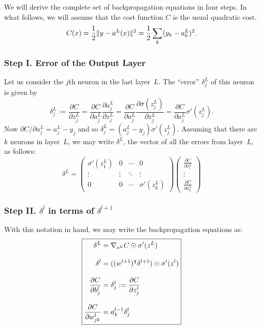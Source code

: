 We will derive the complete set of backpropagation equations in four steps. In what
follows, we will assume that the cost function $C$ is the usual quadratic cost.
\[
    C(x) = \frac{1}{2} \lVert y - a^L(x)\rVert^2 = \frac{1}{2} \sum_{k} (y_k - a_k^L)^2.
\]
\subsubsection{Step I. Error of the Output Layer}
Let us consider the $j$th neuron in the last layer~$L$. The ``error'' $\delta_j^L$
of this neuron is given by
\[
    \delta_j^L := \frac{\partial C}{\partial z_j^L}
    = \frac{\partial C}{\partial a_j^L} \frac{\partial a_j^L}{\partial z_j^L}
    = \frac{\partial C}{\partial a_j^L} \frac{\partial \sigma(z_j^L)}{\partial z_j^L}
    = \frac{\partial C}{\partial a_j^L} \sigma'(z_j^L).
\]
Now $\partial C / \partial a_j^L = a_j^L - y_j$ and so
$\delta_j^L = (a_j^L - y_j) \sigma'(z_j^L)$. Assuming that there are $k$ neurons
in layer~$L$, we may write $\delta^L$, the vector of all the errors from layer~$L$,
as follows:
\begin{equation}
    \delta^L =
    \begin{pmatrix}
        \sigma'(z_1^L)  & 0              & \cdots & 0 \\
        \vdots          & \vdots         & \ddots & \vdots  \\
        0               & 0              & \cdots & \sigma'(z_k^L)
    \end{pmatrix}
    \begin{pmatrix}
        \frac{\partial C}{\partial a_1^L} \\
        \vdots \\
        \frac{\partial C}{\partial a_k^L}
    \end{pmatrix}
\end{equation}

\subsubsection{Step II. $\delta^l$ in terms of $\delta^{l + 1}$}

With this notation in hand, we may write the backpropagation equations
as:
\begin{equation}
\boxed{
\setlength{\jot}{12pt}
\begin{aligned}
    \delta^{L} & = \nabla_{a^L} C \odot \sigma'(z^L) \\
    \delta^{l} & = ( \trans{(w^{l + 1})} \delta^{l + 1} ) \odot \sigma'(z^l) \\
    \frac{\partial C}{\partial b_j^{l}} & = \delta_{j}^l := \frac{\partial C}{\partial z_j^l}\\
    \frac{\partial C}{\partial w_{j k}^l} & = a_{k}^{l - 1} \delta_{j}^l
\end{aligned}
}
\end{equation}

